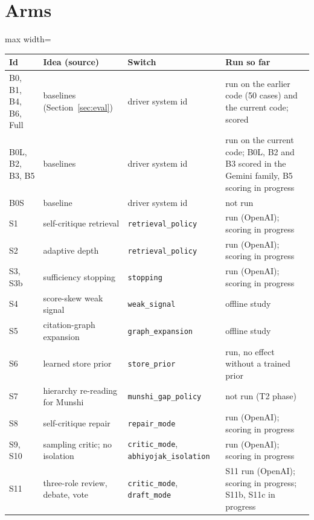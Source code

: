 \section{Arms}
\label{app:arms}

\begin{table}[H]
\centering\small\setlength\tabcolsep{3pt}
\begin{adjustbox}{max width=\textwidth}
\begin{tabular}{@{}lp{5.2cm}p{3.5cm}l@{}}
\toprule
Id & Idea (source) & Switch & Run so far \\
\midrule
B0, B1, B4, B6, Full & baselines (Section~\ref{sec:eval}) & driver system id & run on the earlier code (50 cases) and the current code; scored \\
B0L, B2, B3, B5 & baselines & driver system id & run on the current code; B0L, B2 and B3 scored in the Gemini family, B5 scoring in progress\\ B0S & baseline & driver system id & not run \\
S1 & self-critique retrieval \citep{asai2024selfrag,yan2024crag} & \texttt{retrieval\_policy} & run (OpenAI); scoring in progress \\
S2 & adaptive depth \citep{jeong2024adaptive} & \texttt{retrieval\_policy} & run (OpenAI); scoring in progress \\
S3, S3b & sufficiency stopping \citep{joren2025sufficient} & \texttt{stopping} & run (OpenAI); scoring in progress \\
S4 & score-skew weak signal & \texttt{weak\_signal} & offline study \\
S5 & citation-graph expansion \citep{gutierrez2025hipporag2} & \texttt{graph\_expansion} & offline study \\
S6 & learned store prior \citep{zhang2026agentrouter} & \texttt{store\_prior} & run, no effect without a trained prior \\
S7 & hierarchy re-reading for Munshi & \texttt{munshi\_gap\_policy} & not run (T2 phase) \\
S8 & self-critique repair \citep{gou2024critic,huang2024selfcorrect} & \texttt{repair\_mode} & run (OpenAI); scoring in progress \\
S9, S10 & sampling critic; no isolation \citep{choi2025debate,wynn2025talk} & \texttt{critic\_mode}, \texttt{abhiyojak\_isolation} & run (OpenAI); scoring in progress \\
S11 & three-role review, debate, vote \citep{kumar2025courtevel} & \texttt{critic\_mode}, \texttt{draft\_mode} & S11 run (OpenAI); scoring in progress; S11b, S11c in progress \\

\end{tabular}
\end{adjustbox}
\end{table}
